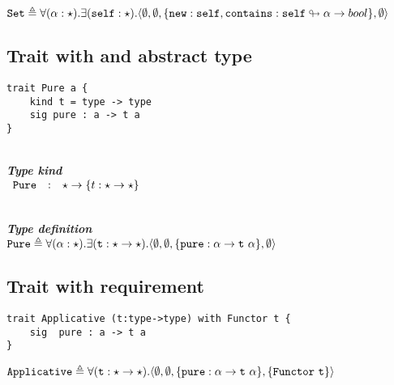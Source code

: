 \documentclass{article}[11pt]
\newcommand{\subsubsubsection}[1]
{
    ~\\
    {\bf {\em #1}} \\
}
\newcommand{\term}[1]{\verb~#1~}
\begin{document}
    \noindent
    \begin{math}
        \term{Set} \triangleq \forall(\alpha:\star).\exists(\term{self}:\star).\langle
        \emptyset,
        \emptyset,
        \{ \term{new} : \term{self}, \term{contains} : \term{self} \looparrowright \alpha \rightarrow bool \},
        \emptyset
        \rangle
    \end{math}

    \subsection{Trait with and abstract type}

    \begin{verbatim}
trait Pure a {
    kind t = type -> type
    sig pure : a -> t a
}
    \end{verbatim}

    \subsubsubsection{Type kind}

    \noindent
    \begin{math}
        \begin{array}{rclp{5cm}}
            \term{Pure} & : & \star \rightarrow \{ t : \star \rightarrow \star \}
        \end{array}
    \end{math}

    \subsubsubsection{Type definition}

    \noindent
    \begin{math}
        \term{Pure} \triangleq \forall(\alpha:\star).\exists(\term{t}:\star \rightarrow \star).\langle
        \emptyset,
        \emptyset,
        \{ \term{pure} : \alpha \rightarrow \term{t}~\alpha \},
        \emptyset
        \rangle
    \end{math}

    \subsection{Trait with requirement}\label{subsec:trait-with-requirement}

    \begin{verbatim}
trait Applicative (t:type->type) with Functor t {
    sig  pure : a -> t a
}
    \end{verbatim}

    \noindent
    \begin{math}
        \term{Applicative} \triangleq \forall(\term{t}:\star \rightarrow \star).
        \langle
        \emptyset,
        \emptyset,
        \{ \term{pure} : \alpha \rightarrow \term{t}~\alpha \},
        \{ \term{Functor}~\term{t} \}
        \rangle
    \end{math}
\end{document}
